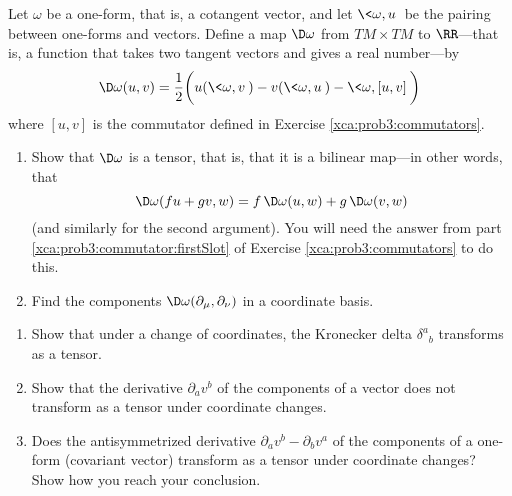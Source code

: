 \begin{xca}
Let $\omega$ be a one-form, that is, a cotangent vector, and let
$\<\omega, u\>$ be the pairing between one-forms and
vectors. Define a map $\D\omega$ from $T M \times T M$ to
$\RR$---that is, a function that takes two tangent vectors and
gives a real number---by
\begin{equation}
\D\omega(u, v) =
\frac{1}{2}\bigg(
u(\<\omega,v\>)-v(\<\omega,u\>)-\<\omega,[u,v]\>
\bigg)
\end{equation}
where $[u,v]$ is the commutator defined in Exercise \ref{xca:prob3:commutators}.
\begin{enumerate}
\item Show that $\D\omega$ is a tensor, that is, that it is a
  bilinear map---in other words, that
\begin{equation}
\D\omega(f u + gv, w) = f\, \D\omega(u, w) + g\,\D\omega(v, w)
\end{equation}
(and similarly for the second argument). You will need the answer from part \ref{xca:prob3:commutator:firstSlot} of
Exercise \ref{xca:prob3:commutators} to do this.
\item Find the components
  $\D\omega(\partial_{\mu},\partial_{\nu})$ in a coordinate
  basis. 
\end{enumerate}
\end{xca}
\begin{xca}
\begin{enumerate}
\item Show that under a change of coordinates, the Kronecker
  delta ${\delta^{a}}_{b}$ transforms as a tensor. 
\item Show that the derivative $\partial_{a} v^{b}$ of the
  components of a vector does not transform as a tensor under
  coordinate changes. 
\item Does the antisymmetrized derivative $\partial_{a} v^{b} -
  \partial_{b} v^{a}$ of the components of a one-form (covariant
  vector) transform as a tensor under coordinate changes? Show
  how you reach your conclusion. 
\end{enumerate}
\end{xca}
